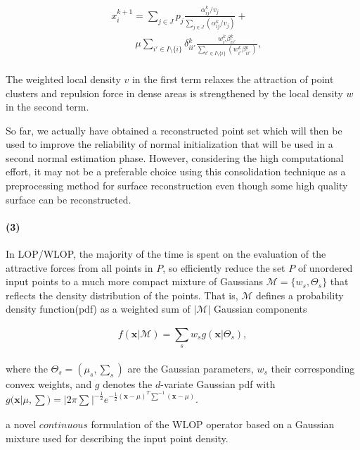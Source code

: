 \small{
\begin{equation}
 \label{eq:WLOP1}
 \begin{split}
 & x{_i^{k+1}}=\sum_{j\in J}^{}p_{j}\frac{\alpha{_{ij}^k}/v_{j}}{\sum_{j\in J}^{}(\alpha{_{ij}^k}/v_{j})}+ \\
 &~~~~~~~~~~~\mu\sum_{{i'}\in I\setminus\{i\}}^{}\delta{_{ii'}^k}\frac{w{_{i'}^k}\beta{_{ii'}^k}}{\sum_{{i'}\in I\setminus\{i\}}^{}(w{_{i'}^k}\beta{_{ii'}^k})},
 \end{split}
\end{equation}
}
\\
The weighted local density $v$ in the first term relaxes the attraction of point clusters and repulsion force in dense areas is strengthened by the local density $w$ in the second term.

So far, we actually have obtained a reconstructed point set which will then be used to improve the reliability of normal initialization that will be used in a second normal estimation phase.
However, considering the high computational effort, it may not be a preferable choice using this consolidation technique as a preprocessing method for surface reconstruction even though some high quality surface can be reconstructed.


\paragraph{(3)}
In LOP/WLOP, the majority of the time is spent on the evaluation of the attractive forces from all points in $P$,
so \cite{preiner2014CPF} efficiently reduce the set $P$ of unordered input points to a much more compact mixture of Gaussians $\mathcal{M}=\{w_{s},\Theta_{s}\}$ that reflects the density distribution of the points.
That is, $\mathcal{M}$ defines a probability density function(pdf) as a weighted sum of $|\mathcal{M}|$ Gaussian components

\small{
\begin{equation}
 \label{eq:TV}
 f(\mathbf{x}|\mathcal{M})=\sum_{s}^{}w_{s}g(\mathbf{x}|\Theta_{s}),
\end{equation}
}
\\
where the $\Theta_{s}=(\mu_{s},\sum_{s}^{})$ are the Gaussian parameters, $w_{s}$ their corresponding convex weights, and $g$ denotes the $d$-variate Gaussian pdf with $g(\mathbf{x}|\mu,\sum)=|2\pi\sum_{}^{}|^{-\frac{1}{2}}e^{-\frac{1}{2}(\mathbf{x}-\mu)^{T}\sum_{}^{-1}(\mathbf{x}-\mu)}$.


a novel $continuous$ formulation of the WLOP operator based on a Gaussian mixture used for describing the input point density.


